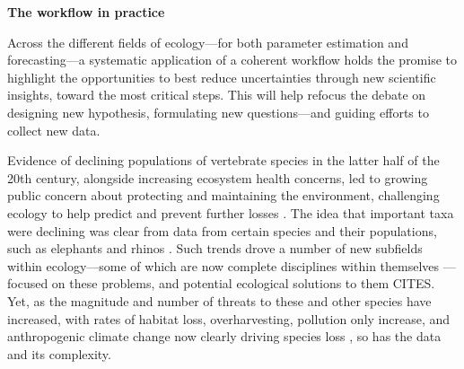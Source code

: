 \documentclass[11pt]{article}
\begin{document}
\vspace{0.5cm}
\noindent \textbf{The workflow in practice}

Across the different fields of ecology---for both parameter estimation and forecasting---a systematic application of a coherent workflow holds the promise to highlight the opportunities to best reduce uncertainties through new scientific insights, toward the most critical steps. This will help refocus the debate on designing new hypothesis, formulating new questions---and guiding efforts to collect new data. 

Evidence of declining populations of vertebrate species in the latter half of the 20th century, alongside increasing ecosystem health concerns, led to growing public concern about protecting and maintaining the environment, challenging ecology to help predict and prevent further losses \citep{soule1999conserving,soule1991conservation}. The idea that important taxa were declining was clear from data from certain species and their populations, such as elephants and rhinos \citep{soule1979benign,leader1990illegal}. Such trends drove a number of new subfields within ecology---some of which are now complete disciplines within themselves \citep[such as conservation biology,][]{soule1985conservation}---focused on these problems, and potential ecological solutions to them CITES. Yet, as the magnitude and number of threats to these and other species have increased, with rates of habitat loss, overharvesting, pollution only increase, and anthropogenic climate change now clearly driving species loss \citep{waller2017bramble}, so has the data and its complexity. 
\end{document}
